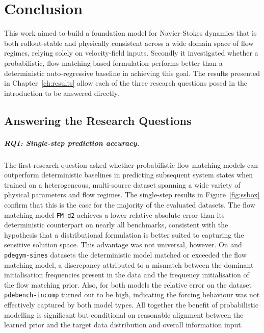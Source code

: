 \chapter{Conclusion}\label{ch:conclusion}

This work aimed to build a foundation model for Navier-Stokes dynamics that is both rollout-stable and physically consistent across a wide domain space of flow regimes, relying solely on velocity-field inputs. Secondly it investigated whether a probabilistic, flow-matching-based formulation performs better than a deterministic auto-regressive baseline in achieving this goal. The results presented in Chapter~\ref{ch:results} allow each of the three research questions posed in the introduction to be answered directly.

\section{Answering the Research Questions}

\paragraph{RQ1: Single-step prediction accuracy.} The first research question asked whether probabilistic flow matching models can outperform deterministic baselines in predicting subsequent system states when trained on a heterogeneous, multi-source dataset spanning a wide variety of physical parameters and flow regimes. The single-step results in Figure~\ref{fig:ssbox} confirm that this is the case for the majority of the evaluated datasets. The flow matching model \texttt{FM-d2} achieves a lower relative absolute error than its deterministic counterpart on nearly all benchmarks, consistent with the hypothesis that a distributional formulation is better suited to capturing the sensitive solution space. This advantage was not universal, however. On and \texttt{pdegym-sines} datasets the deterministic model matched or exceeded the flow matching model, a discrepancy attributed to a mismatch between the dominant initialisation frequencies present in the data and the frequency initialisation of the flow matching prior. Also, for both models the relative error on the dataset \texttt{pdebench-incomp} turned out to be high, indicating the forcing behaviour was not effectively captured by both model types. All together the benefit of probabilistic modelling is significant but conditional on reasonable alignment between the learned prior and the target data distribution and overall information input.

